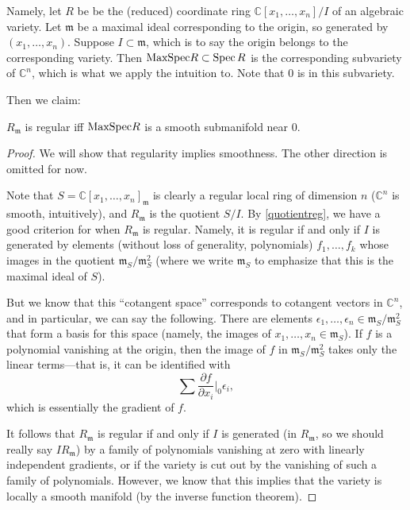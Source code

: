 Namely, let $R$ be  be the (reduced) coordinate ring $ \mathbb{C}[x_1, \dots, x_n]/I$ of an algebraic
variety. Let $\mathfrak{m}$ be  a maximal ideal corresponding to the origin,
so generated by $(x_1, \dots, x_n)$. Suppose $I \subset \mathfrak{m}$, which is
to say the origin belongs to the corresponding variety.
Then $\mathrm{MaxSpec} R \subset \operatorname{Spec} R$ is the corresponding subvariety of $\mathbb{C}^n$, which is
what we apply the intuition to. Note that $0$ is in this subvariety.

Then we claim:

\begin{proposition} 
$R_{\mathfrak{m}}$ is regular iff $\mathrm{MaxSpec} R$ is a smooth submanifold near $0$.
\end{proposition}
\begin{proof} 
We will show that regularity implies smoothness. The other direction is
omitted for now.

Note that $S = \mathbb{C}[x_1, \dots, x_n]_{\mathfrak{m}}$ is clearly a regular
local ring of dimension $n$ ($\mathbb{C}^n$ is smooth, intuitively), and $R_{\mathfrak{m}}$ is the quotient $S/I$. By
\cref{quotientreg}, we have a good criterion for when $R_{\mathfrak{m}}$ is
regular.
Namely, it is regular if and only if $I$ is generated by elements (without loss
of generality, polynomials) $f_1, \dots, f_k$ whose images in
the quotient $\mathfrak{m}_S/\mathfrak{m}_S^2$ (where we write
$\mathfrak{m}_S$ to emphasize that this is the maximal ideal of $S$). 

But we
know that this ``cotangent space'' corresponds to cotangent vectors in $\mathbb{C}^n$, and in
particular, we can say the following. There are elements $\epsilon_1, \dots,
\epsilon_n  \in \mathfrak{m}_S/\mathfrak{m}_S^2$ that form a basis for this
space (namely, the images of $x_1, \dots, x_n \in \mathfrak{m}_S$). If $f$ is a
polynomial vanishing at the origin, then the image of $f$ in
$\mathfrak{m}_S/\mathfrak{m}_S^2$ takes only the linear terms---that is, it can
be identified with 
\[ \sum \frac{\partial f}{\partial x_i}|_{0} \epsilon_i, \]
which is essentially the gradient of $f$.

It follows that $R_{\mathfrak{m}}$ is regular if and only if $I$ is generated
(in $R_{\mathfrak{m}}$, so we should really say $IR_{\mathfrak{m}}$)
by a family of polynomials vanishing at zero with linearly independent
gradients, or if the variety is cut out by the vanishing of such a family of
polynomials.  However, we know that this implies that the variety is locally a
smooth manifold (by the inverse function theorem).
\end{proof} 


